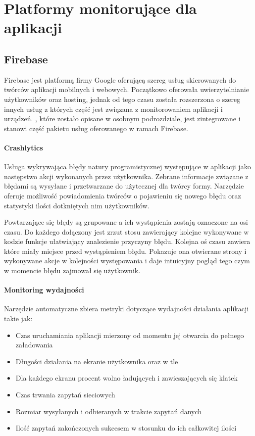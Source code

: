 \section{Platformy monitorujące dla aplikacji}



\subsection{Firebase}
\label{sec:firebase}
Firebase jest platformą firmy Google oferującą szereg usług skierowanych do twórców aplikacji mobilnych i webowych. Początkowo oferowała uwierzytelnianie użytkowników oraz hosting, jednak od tego czasu została rozszerzona o szereg innych usług z których część jest związana z monitorowaniem aplikacji i urządzeń. , które zostało opisane w osobnym podrozdziale, jest zintegrowane i stanowi część pakietu usług oferowanego w ramach Firebase.

\paragraph{Crashlytics}
Usługa wykrywająca błędy natury programistycznej występujące w aplikacji jako następstwo akcji wykonanych przez użytkownika. Zebrane informacje związane z błędami są wysyłane i przetwarzane do użytecznej dla twórcy formy. Narzędzie oferuje możliwość powiadomienia twórców o pojawieniu się nowego błędu oraz statystyki ilości dotkniętych nim użytkowników.

Powtarzające się błędy są grupowane a ich wystąpienia zostają oznaczone na osi czasu. Do każdego dołączony jest zrzut stosu zawierający kolejne wykonywane w kodzie funkcje ułatwiający znalezienie przyczyny błędu. Kolejna oś czasu zawiera {\it {}} które miały miejsce przed wystąpieniem błędu. Pokazuje ona otwierane strony i wykonywane akcje w kolejności występowania i daje intuicyjny pogląd tego czym w momencie błędu zajmował się użytkownik. 

\paragraph{Monitoring wydajności}
Narzędzie automatyczne zbiera metryki dotyczące wydajności działania aplikacji takie jak:
\begin{itemize}
	\item Czas uruchamiania aplikacji mierzony od momentu jej otwarcia do pełnego załadowania
	\item Długości działania na ekranie użytkownika oraz w tle
	\item Dla każdego ekranu procent wolno ładujących i zawieszających się klatek
	\item Czas trwania zapytań sieciowych
	\item Rozmiar wysyłanych i odbieranych w trakcie zapytań danych
	\item Ilość zapytań zakończonych sukcesem w stosunku do ich całkowitej ilości
\end{itemize}
\bigskip

